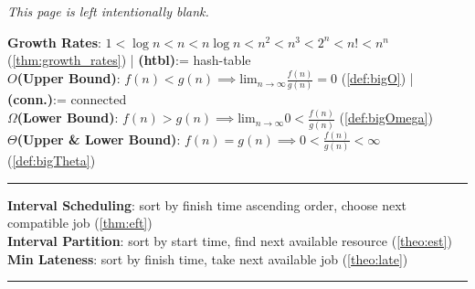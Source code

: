 \vfill

\begin{center}
\textit{This page is left intentionally blank.}
\end{center}
\vfill
\newpage

\noindent
\textbf{Growth Rates}: $1 < \log n < n < n \log n < n^2 < n^3 < 2^n < n! < n^n$ (\ref{thm:growth_rates}) | \textbf{(htbl)}:= hash-table\\
\textbf{$O$(Upper Bound)}: $f(n) < g(n)\implies $lim$_{n\to\infty}\frac{f(n)}{g(n)}=0$ (\ref{def:bigO}) \hspace{5.47em}| \textbf{(conn.)}:= connected\\
\textbf{$\Omega$(Lower Bound)}: $f(n) > g(n)\implies $lim$_{n\to\infty}0<\frac{f(n)}{g(n)}$ (\ref{def:bigOmega})\\
\textbf{$\Theta$(Upper \& Lower Bound)}: $f(n) = g(n)\implies 0<\frac{f(n)}{g(n)}<\infty$ (\ref{def:bigTheta})\\
\noindent\rule{\textwidth}{0.4pt}
\textbf{Interval Scheduling}: sort by finish time ascending order, choose next compatible job (\ref{thm:eft})\\
\textbf{Interval Partition}: sort by start time, find next available resource (\ref{theo:est})\\
\textbf{Min Lateness}: sort by finish time, take next available job (\ref{theo:late})\\
\noindent\rule{\textwidth}{0.4pt}

\vspace{.5em}
\noindent

